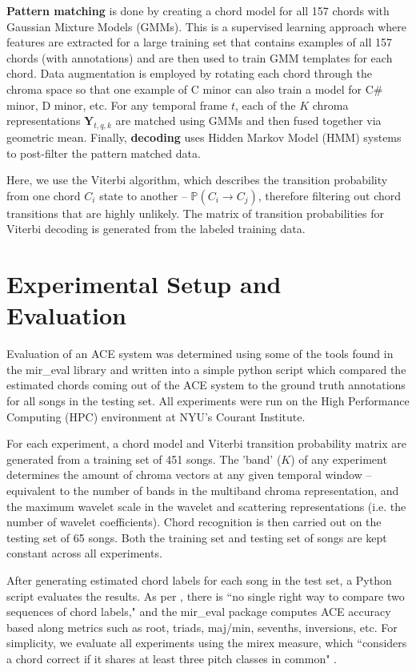 \documentclass{article}
\makeatletter
\newcommand*{\ie}{i.e.\@\xspace}
\makeatother
\begin{document}
	
\textbf{Pattern matching} is done by creating a chord model for all 157 chords with Gaussian Mixture
Models (GMMs). This is a supervised learning approach where features are extracted
for a large training set that contains examples of all 157 chords (with annotations) and are
then used to train GMM templates for each chord. Data augmentation is employed by rotating each
chord through the chroma space so that one example of C minor can also train a model for
C\# minor, D minor, etc. For any temporal frame $t$, each of the $K$ chroma representations
$\boldsymbol{Y}_{t,q,k}$ are matched using GMMs and then fused together via geometric mean.
Finally, \textbf{decoding} uses Hidden Markov Model (HMM) systems to post-filter the pattern
matched data.

Here, we use the Viterbi algorithm, which describes the transition probability from
one chord $C_i$ state to another -- $\mathds{P}(C_i \rightarrow C_j)$, therefore filtering out chord
transitions that are highly unlikely. The matrix of transition probabilities for Viterbi decoding is
generated from the labeled training data.


\section{Experimental Setup and Evaluation}\label{sec:experiment}
Evaluation of an ACE system was determined using some of the tools found in the
mir\_eval library \cite{raffel2014mir} and written into a simple python script which compared the
estimated chords coming out of the ACE system to the ground truth annotations for all songs
in the testing set.
All experiments were run on the High Performance Computing (HPC) environment at
NYU's Courant Institute. 
	
For each experiment, a chord model and Viterbi transition probability matrix are generated from a 
training set of 451 songs.
The 'band' ($K$) of any experiment determines the amount of chroma vectors at any given temporal
window -- equivalent to the number of bands in the multiband chroma representation, and the
maximum wavelet scale in the wavelet and scattering representations (\ie the number of wavelet
coefficients). Chord recognition is then carried out on the testing set of 65 songs.
Both the training set and testing set of songs are kept constant across all experiments.
	
After generating estimated chord labels for each song in the test set,
a Python script evaluates the results.
As per \cite{raffel2014mir}, there is ``no single right way to compare two sequences of chord labels,"
and the mir\_eval package computes ACE accuracy based along metrics such as root, triads,
maj/min, sevenths, inversions, etc.
For simplicity, we evaluate all experiments using the mirex measure, which ``considers a chord
correct if it shares at least three pitch classes in common" \cite{raffel2014mir}.
	
\end{document}
